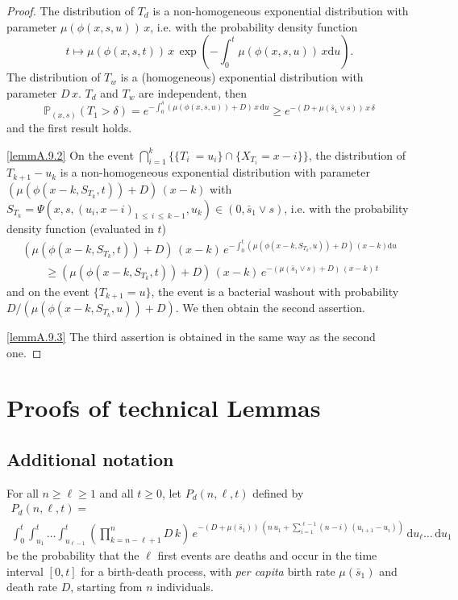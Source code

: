 \documentclass[10pt]{amsart}
\theoremstyle{definition}\newtheorem{defi}[theo]{Definition}\newtheorem{rema}[theo]{Remark}\newtheorem{exam}[theo]{Example}\newtheorem{exem}[theo]{Example}\newtheorem{nota}[theo]{Notation}
\newcommand{\PP}{\mathbb{P}}
\newcommand{\dif}{\mathrm{d}}
\newcommand{\barmu}{\mu(\bar s_1)}
\newcommand{\1}{\mathbf{1}}
\begin{document}
\begin{proof}
The distribution of $T_{d}$ is a non-homogeneous exponential distribution with parameter $\mu(\phi(x,s,u))\,x$, i.e. with the probability density function
\[
t\mapsto \mu(\phi(x,s,t))\,x\,\exp\left({-\int_0^t \mu(\phi(x,s,u))\,x \dif u}\right).
\]
The distribution of $T_{w}$ is a (homogeneous) exponential distribution with parameter $D\,x$. $T_{d}$ and $T_{w}$ are independent, then
\[
\PP_{(x,s)}(T_1 > \delta) = e^{-\int_0^\delta (\mu(\phi(x,s,u))+D)\,x \, \dif u}
\geq e^{-(D+\mu(\bar s_1 \vee s))\,x\,\delta}
\]
and the first result holds.


\eqref{lemmA.9.2} On the event $\bigcap_{i=1}^{k}\{\{T_i\ =u_i\} \cap \{ X_{T_i} = x-i \}\}$, the distribution of $T_{k+1}-u_k$ is a non-homogeneous exponential distribution with parameter $(\mu(\phi(x-k,S_{T_k},t))+D)\,(x-k)$ with $S_{T_k} = \Psi(x,s,(u_i,x-i)_{1\,\leq\,i \,\leq\,k-1}, u_k) \in (0,\bar s_1 \vee s)$, i.e. with the probability density function (evaluated in $t$)
\begin{multline*}
(\mu(\phi(x-k,S_{T_k},t))+D)\,(x-k)\,e^{-\int_0^t \left(\mu\left(\phi(x-k,S_{T_k},u)\right)+D\right)\,(x-k) \dif u}
\\ \qquad \geq (\mu(\phi(x-k,S_{T_k},t))+D)\,(x-k)\,e^{-(\mu(\bar s_1 \vee s)+D)\,(x-k)\,t}
\end{multline*}
and on the event $\{T_{k+1}=u\}$, the event is a bacterial washout with probability $D/(\mu(\phi(x-k,S_{T_k},u))+D)$. We then obtain the second assertion.

\eqref{lemmA.9.3} The third assertion is obtained in the same way as the second one.
\end{proof}



\section{Proofs of technical Lemmas}\label{sec.proofs.lemmas}



\subsection{Additional notation}\label{sec.add.notation.app}

For all $n\geq \ell\geq 1$ and all $t\geq0$, let $P_d(n,\ell,t)$ defined by
\begin{multline*}
P_d(n,\ell,t) = \\
\int_0^{t} \int_{u_1}^{t}\dots \int_{u_{\ell-1}}^{t}
\left(\prod_{k=n-\ell+1}^{n}D\,k\right)\, e^{-(D+\barmu)\,\left(n\,u_1+
\sum\limits_{i=1}^{\ell-1}(n-i)\,(u_{i+1}-u_{i})\right)}\,
\dif u_\ell \dots\,\dif u_1
\end{multline*}
be the probability that the $\ell$ first events are deaths and occur in the time interval $[0,t]$ for a birth-death process, with \emph{per capita} birth rate $\barmu$ and death rate $D$, starting from $n$ individuals.
\end{document}
